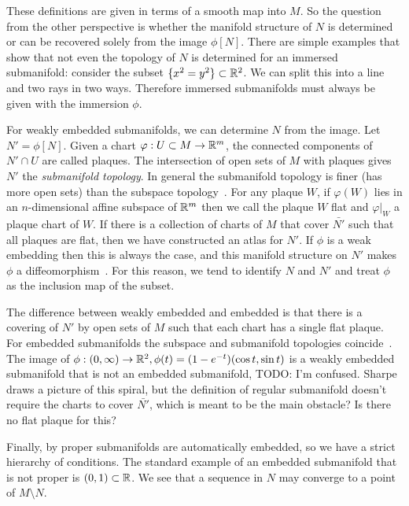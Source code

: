 These definitions are given in terms of a smooth map into $M$.
So the question from the other perspective is whether the manifold structure of $N$ is determined or can be recovered solely from the image $\phi[N]$.
There are simple examples that show that not even the topology of $N$ is determined for an immersed submanifold: consider the subset $\{x^2 = y^2\} \subset \mathbb{R}^2$.
We can split this into a line and two rays in two ways.
Therefore immersed submanifolds must always be given with the immersion $\phi$.

For weakly embedded submanifolds, we can determine $N$ from the image.
Let $N' = \phi[N]$.
Given a chart $\varphi: U \subset M \to \mathbb{R}^m$, the connected components of $N'\cap U$ are called plaques.
The intersection of open sets of $M$ with plaques gives $N'$ the \emph{submanifold topology}.
In general the submanifold topology is finer (has more open sets) than the subspace topology~\cite[Def~1.2.4]{Sharpe1997}.
For any plaque $W$, if $\varphi(W)$ lies in an $n$-dimensional affine subspace of $\mathbb{R}^m$ then we call the plaque $W$ flat and $\varphi|_W$ a plaque chart of $W$.
If there is a collection of charts of $M$ that cover $\bar{N'}$ such that all plaques are flat, then we have constructed an atlas for $N'$.
If $\phi$ is a weak embedding then this is always the case, and this manifold structure on $N'$ makes $\phi$ a diffeomorphism~\cite[Thm~1.2.7]{Sharpe1997}.
For this reason, we tend to identify $N$ and $N'$ and treat $\phi$ as the inclusion map of the subset.

The difference between weakly embedded and embedded is that there is a covering of $N'$ by open sets of $M$ such that each chart has a single flat plaque.
For embedded submanifolds the subspace and submanifold topologies coincide~\cite[Prop~1.2.9]{Sharpe1997}.
The image of $\phi : (0,\infty) \to \mathbb{R}^2, \phi(t) = (1-e^{-t})(\cos t, \sin t)$ is a weakly embedded submanifold that is not an embedded submanifold, 
TODO: I'm confused. Sharpe draws a picture of this spiral, but the definition of regular submanifold doesn't require the charts to cover $\bar{N'}$, which is meant to be the main obstacle? Is there no flat plaque for this?

Finally, by \cite[Thm~1.2.11]{Sharpe1997} proper submanifolds are automatically embedded, so we have a strict hierarchy of conditions.
The standard example of an embedded submanifold that is not proper is $(0,1) \subset \mathbb{R}$.
We see that a sequence in $N$ may converge to a point of $M\setminus N$.

